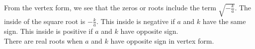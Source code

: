 \documentclass{ximera}
\begin{document}
\begin{observation}



From the vertex form, we see that the zeros or roots include the term $\sqrt{-\frac{k}{a}}$.  The inside of the square root is $-\frac{k}{a}$.  This inside is negative if $a$ and $k$ have the same sign. This inside is positive if $a$ and $k$ have opposite sign. \\

There are real roots when $a$ and $k$ have opposite sign in vertex form. \\



\end{observation}
\end{document}
